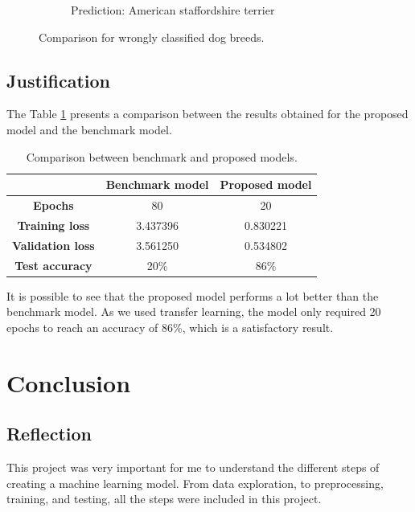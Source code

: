 \documentclass{article}
\begin{document}
\begin{figure}[htbp]
\begin{subfigure}{.45\textwidth}
            \caption{Prediction: American staffordshire terrier}
            \label{fig:american_staffy}
        \end{subfigure}
        \caption{Comparison for wrongly classified dog breeds.}
        \label{fig:comparison_wrong}
    \end{figure}

    \subsection{Justification}

    The Table \ref*{tab:results_comparison} presents a comparison between the results obtained for the proposed model and the benchmark model.

    \begin{table}[htbp]
        \centering
        \begin{tabular}{c|c|c}
             & \textbf{Benchmark model} & \textbf{Proposed model} \\
            \hline
            \textbf{Epochs} & 80 & 20 \\
            \textbf{Training loss} & 3.437396 & 0.830221 \\
            \textbf{Validation loss} & 3.561250 & 0.534802 \\
            \textbf{Test accuracy} & 20\% & 86\% \\
        \end{tabular}
        \caption{Comparison between benchmark and proposed models.}
        \label{tab:results_comparison}
    \end{table}

    It is possible to see that the proposed model performs a lot better than the benchmark model. As we used transfer learning, the model only required 20 epochs to reach an accuracy of 86\%, which is a satisfactory result.

    \section{Conclusion}

    \subsection{Reflection}

    This project was very important for me to understand the different steps of creating a machine learning model. From data exploration, to preprocessing, training, and testing, all the steps were included in this project.
\end{document}
